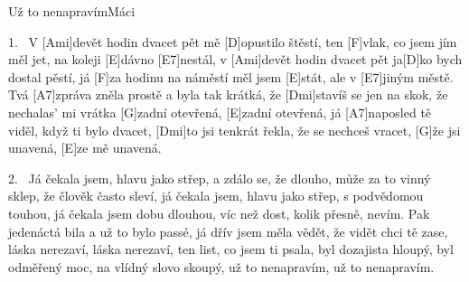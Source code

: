 \begin{song}{Už to nenapravím}{Máci}

\begin{xverse}{1.~}
V [\large Ami]devět hodin dvacet pět mě [\large D]opustilo štěstí,
ten [\large F]vlak, co jsem jím měl jet, na koleji [\large E]dávno [\large E7]nestál,
v [\large Ami]devět hodin dvacet pět ja[\large D]ko bych dostal pěstí,
já [\large F]za hodinu na náměstí měl jsem [\large E]stát, ale v [\large E7]jiným městě.
Tvá [\large A7]zpráva zněla prostě a byla tak krátká,
že [\large Dmi]stavíš se jen na skok, že nechalas' mi vrátka
[\large G]zadní otevřená, [\large E]zadní otevřená,
já [\large A7]naposled tě viděl, když ti bylo dvacet,
[\large Dmi]to jsi tenkrát řekla, že se nechceš vracet,
[\large G]{že} jsi unavená, [\large E]ze mě unavená.
\end{xverse}

\begin{xverse}{2.~}
Já čekala jsem, hlavu jako střep, a zdálo se, že dlouho,
může za to vinný sklep, že člověk často sleví,
já čekala jsem, hlavu jako střep, s podvědomou touhou,
já čekala jsem dobu dlouhou, víc než dost, kolik přesně, nevím.
Pak jedenáctá bila a už to bylo passé,
já dřív jsem měla vědět, že vidět chci tě zase,
láska nerezaví, láska nerezaví,
ten list, co jsem ti psala, byl dozajista hloupý,
byl odměřený moc, na vlídný slovo skoupý,
už to nenapravím, už to nenapravím.
\end{xverse}

\end{song}

